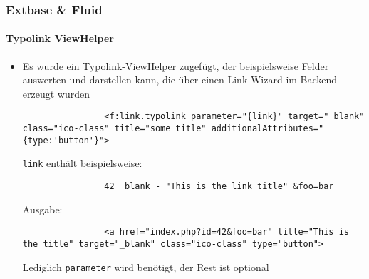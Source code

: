 
\begin{frame}[fragile]
	\frametitle{Extbase \& Fluid}
	\framesubtitle{Typolink ViewHelper}

	\lstset{
		basicstyle=\tiny\ttfamily
	}

	\begin{itemize}
		\item Es wurde ein Typolink-ViewHelper zugefügt, der beispielsweise Felder
			auswerten und darstellen kann, die über einen Link-Wizard im Backend
			erzeugt wurden

			\begin{lstlisting}
				<f:link.typolink parameter="{link}" target="_blank" class="ico-class" title="some title" additionalAttributes="{type:'button'}">
			\end{lstlisting}

			\texttt{link} enthält beispielsweise:
			\begin{lstlisting}
				42 _blank - "This is the link title" &foo=bar
			\end{lstlisting}

			Ausgabe:
			\begin{lstlisting}
				<a href="index.php?id=42&foo=bar" title="This is the title" target="_blank" class="ico-class" type="button">
			\end{lstlisting}

			Lediglich \texttt{parameter} wird benötigt, der Rest ist optional

	\end{itemize}

\end{frame}


